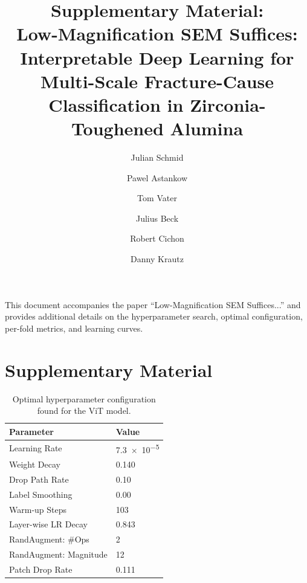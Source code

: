 \documentclass[runningheads]{llncs}
\title{Supplementary Material:\\
Low-Magnification SEM Suffices: Interpretable Deep Learning
for Multi-Scale Fracture-Cause Classification in
Zirconia-Toughened Alumina}
\author{Julian Schmid \and Pawel Astankow \and Tom Vater \and
        Julius Beck \and Robert Cichon \and Danny Krautz}
\institute{CeramTec GmbH, Plochingen, Germany}
\begin{document}
\maketitle

\noindent This document accompanies the paper
``Low-Magnification SEM Suffices...'' and provides additional
details on the hyperparameter search, optimal configuration,
per-fold metrics, and learning curves.





\appendix
\section*{Supplementary Material}

\begin{table}[h]
    \centering
    \caption{Optimal hyperparameter configuration found for the ViT model.}
    \setlength{\tabcolsep}{4pt}      %

    \label{tab:vit_best_trial}
    \begin{tabular}{@{}ll@{}}
    \toprule
    \textbf{Parameter} & \textbf{Value} \\
    \midrule
    Learning Rate        & \num{7.3e-5} \\
    Weight Decay         & 0.140 \\
    Drop Path Rate       & 0.10 \\
    Label Smoothing      & 0.00 \\
    Warm-up Steps        & 103 \\
    Layer-wise LR Decay  & 0.843 \\
    RandAugment: \#Ops   & 2 \\
    RandAugment: Magnitude & 12 \\
    Patch Drop Rate      & 0.111 \\
    \bottomrule
    \end{tabular}
\end{table}
\end{document}
